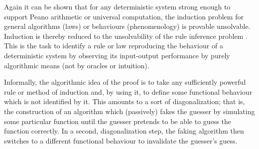 Again it can be shown that for any deterministic system strong enough to support Peano arithmetic or
universal computation, the  induction problem for general algorithms (laws) or behaviours (phenomenology)
is provable unsolvable.
Induction is thereby reduced to the unsolvability of
the rule inference problem \cite{go-67,blum75blum,angluin:83,ad-91,li:92}.
This is the task to identify a rule or law reproducing the behaviour of a deterministic system
by observing its input-output performance by purely algorithmic means
(not by oracles or intuition).

Informally, the algorithmic idea of the proof is to take any sufficiently powerful
rule or method of induction and, by using it, to define some
functional behaviour which is not identified by it.
This amounts to a sort of diagonalization; that is,
the construction of an algorithm which
(passively)
fakes the guesser by simulating some particular function
until the guesser
pretends to be able to guess the function correctly.
In a second,  diagonalization step, the faking algorithm then switches to a different
 functional behaviour to invalidate the guesser's guess.

%
%
%

